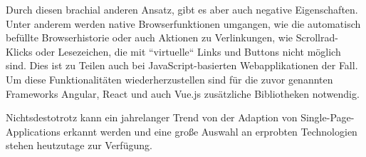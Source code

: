 Durch diesen brachial anderen Ansatz, gibt es aber auch negative Eigenschaften. Unter anderem werden native Browserfunktionen umgangen, wie die automatisch befüllte Browserhistorie oder auch Aktionen zu Verlinkungen, wie Scrollrad-Klicks oder Lesezeichen, die mit ``virtuelle`` Links und Buttons nicht möglich sind. Dies ist zu Teilen auch bei JavaScript-basierten Webapplikationen der Fall. Um diese Funktionalitäten wiederherzustellen sind für die zuvor genannten Frameworks Angular, React und auch Vue.js zusätzliche Bibliotheken notwendig.

Nichtsdestotrotz kann ein jahrelanger Trend von der Adaption von Single-Page-Applications erkannt werden und eine große Auswahl an erprobten Technologien stehen heutzutage zur Verfügung.


